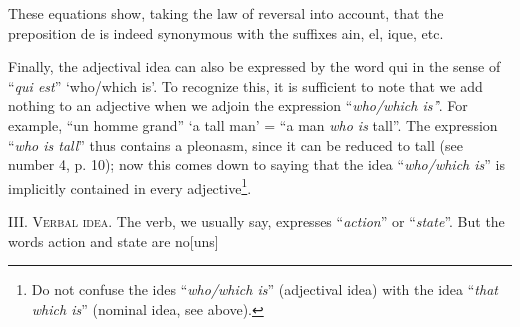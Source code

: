 {      \noindent
      These equations show, taking the law of reversal into account,
      that the preposition \textup{de} is indeed synonymous with the
      suffixes \textup{ain}, \textup{el}, \textup{ique}, etc.

      Finally, the adjectival idea can also be expressed by the word
      \textup{qui} in the sense of ``\emph{qui est}'' `who/which
      is'. To recognize this, it is sufficient to note that we add
      nothing to an adjective when we adjoin the expression
      ``\emph{who/which is'}'. For example, ``un homme grand'' `a tall
      man' = ``a man \emph{who is} tall''.  The expression ``\emph{who
        is tall}'' thus contains a pleonasm, since it can be reduced
      to \textup{tall} (see number 4, p. 10); now this comes down to
      saying that the idea ``\emph{who/which is}'' is implicitly
      contained in every adjective\footnote{Do not confuse the ides
        ``\emph{who/which is}'' (adjectival idea) with the idea
        ``\emph{that which is}'' (nominal idea, see above).}.

      III. \textsc{Verbal idea}. The verb, we usually say, expresses
      ``\emph{action}'' or ``\emph{state}''.  But the words
      \textup{action} and \textup{state} are no[uns]
    }

